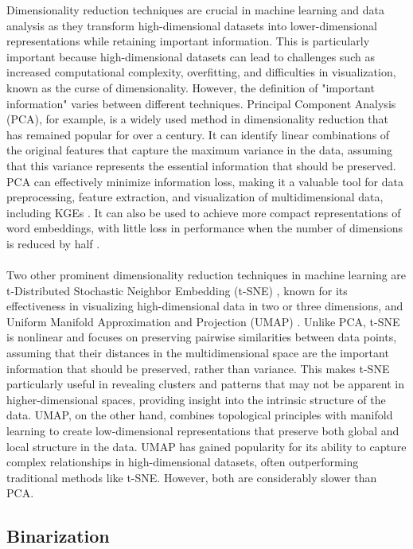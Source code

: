 \documentclass[11pt,titlepage,oneside,openany]{book}
\begin{document}
Dimensionality reduction techniques are crucial in machine learning and data analysis as they transform high-dimensional datasets into lower-dimensional representations while retaining important information. This is particularly important because high-dimensional datasets can lead to challenges such as increased computational complexity, overfitting, and difficulties in visualization, known as the curse of dimensionality. However, the definition of "important information" varies between different techniques. Principal Component Analysis (PCA), for example, is a widely used method in dimensionality reduction that has remained popular for over a century. It can identify linear combinations of the original features that capture the maximum variance in the data, assuming that this variance represents the essential information that should be preserved. PCA can effectively minimize information loss, making it a valuable tool for data preprocessing, feature extraction, and visualization of multidimensional data, including KGEs \cite{ristoski_rdf2vec_2019}. It can also be used to achieve more compact representations of word embeddings, with little loss in performance when the number of dimensions is reduced by half \cite{raunak_simple_2017}.\\
\\
Two other prominent dimensionality reduction techniques in machine learning are t-Distributed Stochastic Neighbor Embedding (t-SNE) \cite{van_der_maaten_visualizing_2008}, known for its effectiveness in visualizing high-dimensional data in two or three dimensions, and Uniform Manifold Approximation and Projection (UMAP) \cite{mcinnes_umap_2020}. Unlike PCA, t-SNE is nonlinear and focuses on preserving pairwise similarities between data points, assuming that their distances in the multidimensional space are the important information that should be preserved, rather than variance. This makes t-SNE particularly useful in revealing clusters and patterns that may not be apparent in higher-dimensional spaces, providing insight into the intrinsic structure of the data. UMAP, on the other hand, combines topological principles with manifold learning to create low-dimensional representations that preserve both global and local structure in the data. UMAP has gained popularity for its ability to capture complex relationships in high-dimensional datasets, often outperforming traditional methods like t-SNE. However, both are considerably slower than PCA.


\subsection{Binarization}
\label{subsec:binarization}
\end{document}

